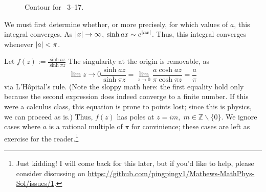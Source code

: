 \item

\begin{figure}[h]
	\centering
	\caption{Contour for ~3--17.}%
	\label{fig:problem3-17}
\end{figure}

We must first determine whether, or more precisely, for which values of $a$, this integral converges.
As $\left| x \right| \rightarrow \infty$, $\sinh ax \sim e^{\left| ax \right|}$.
Thus, this integral converges whenever $\left| a \right| < \pi$.

Let $f(z) := \frac{\sinh az}{\sinh \pi z}$
The singularity at the origin is removable, as
\[
    \lim{z \rightarrow 0} \frac{\sinh az}{\sinh \pi z}
    = \lim_{z \rightarrow 0} \frac{a \cosh az}{\pi \cosh \pi z}
    = \frac{a}{\pi}
\]
via L'H\^opital's rule.
(Note the sloppy math here:
the first equality hold only because the second expression does indeed converge to a finite number.
If this were a calculus class, this equation is prone to points lost;
since this is physics, we can proceed as is.)
Thus, $f(z)$ has poles at $z = im,\; m \in \mathbb{Z} \backslash \{0\}$.
We ignore cases where $a$ is a rational multiple of $\pi$ for convinience;
these cases are left as exercise for the reader.\footnote{
Just kidding!
I will come back for this later, but if you'd like to help,
please consider discussing on \url{https://github.com/pingpingy1/Mathews-MathPhys-Sol/issues/1}.
}

